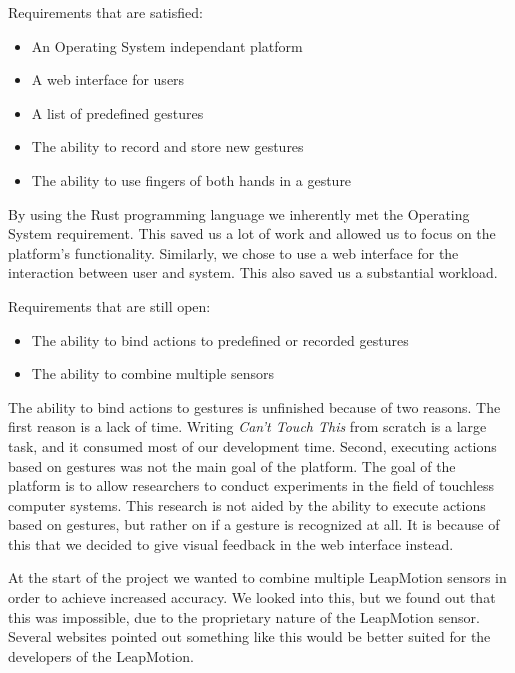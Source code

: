 \documentclass[a4paper]{article}
\providecommand{\tightlist}{%
\setlength{\itemsep}{0pt}\setlength{\parskip}{0pt}}
\begin{document}
  Requirements that are satisfied: 
  \begin{itemize}
    \tightlist{}
    \item An Operating System independant platform
    \item A web interface for users
    \item A list of predefined gestures
    \item The ability to record and store new gestures
    \item The ability to use fingers of both hands in a gesture
  \end{itemize}
  By using the Rust programming language we inherently met the Operating System
  requirement. This saved us a lot of work and allowed us to focus on the
  platform's functionality. Similarly, we chose to use a web interface for the
  interaction between user and system. This also saved us a substantial
  workload.

  Requirements that are still open:
  \begin{itemize}
    \tightlist{}
    \item The ability to bind actions to predefined or recorded gestures
    \item The ability to combine multiple sensors
  \end{itemize}
  The ability to bind actions to gestures is unfinished because of two reasons.
  The first reason is a lack of time. Writing \textit{Can't Touch This} from
  scratch is a large task, and it consumed most of our development time. Second,
  executing actions based on gestures was not the main goal of the platform. The
  goal of the platform is to allow researchers to conduct experiments in the
  field of touchless computer systems. This research is not aided by the ability
  to execute actions based on gestures, but rather on if a gesture is
  recognized at all. It is because of this that we decided to give visual
  feedback in the web interface instead.

  At the start of the project we wanted to combine multiple LeapMotion sensors
  in order to achieve increased accuracy. We looked into this, but we found out
  that this was impossible, due to the proprietary nature of the LeapMotion
  sensor. Several websites pointed out something like this would be better
  suited for the developers of the LeapMotion.
  \clearpage

\end{document}
